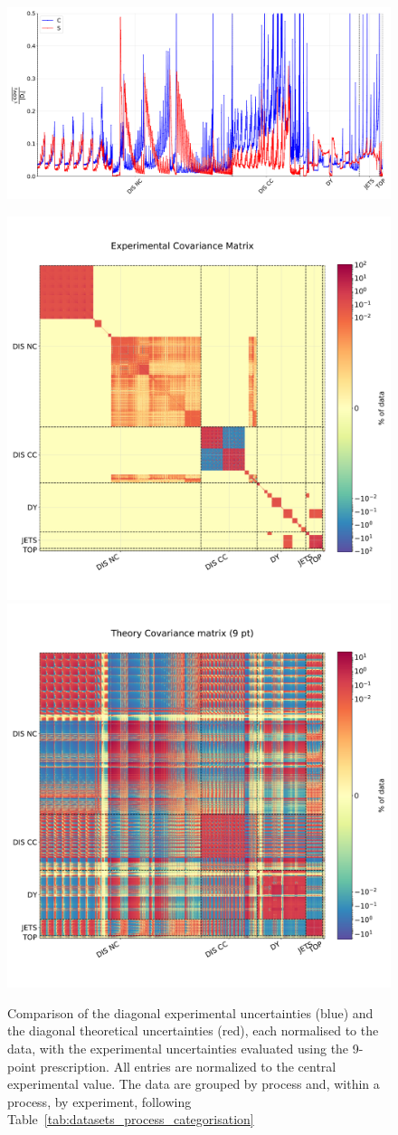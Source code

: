 \begin{figure}[t!]
  \begin{center}
    \includegraphics[width=1.0\linewidth]{mhous/plots/9pt_diagonal_elements.pdf}
    \caption{\small Comparison of the diagonal experimental uncertainties 
    (blue) and the diagonal theoretical uncertainties  
      (red), each normalised to the data, with the experimental uncertainties 
          evaluated using the 9-point
      prescription.
      All entries are normalized to the central experimental value.
  The data are grouped by process and, within a process, by experiment, following
  Table~\ref{tab:datasets_process_categorisation} 
        \label{fig:diag_covmats} }
  \end{center}
  \begin{center}
    \includegraphics[width=0.49\linewidth]{mhous/plots/exp_covmat.pdf}
    \includegraphics[width=0.49\linewidth]{mhous/plots/th_covmat_9pt.pdf}

\end{center}
\end{figure}
